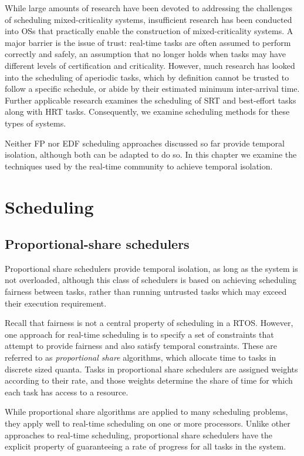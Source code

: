 While large amounts of research have been devoted to addressing the challenges of scheduling
mixed-criticality systems, insufficient research has been conducted into
\glspl{OS} that practically enable the construction of mixed-criticality systems. 
A major barrier is the issue of trust: real-time tasks are often
assumed to perform correctly and safely, an assumption that no longer holds when tasks may have
different levels of certification and criticality.  However, much research has looked into the scheduling of
aperiodic tasks, which by definition cannot be trusted to follow a specific schedule, or abide by
their estimated minimum inter-arrival time. Further applicable research examines the scheduling of
\gls{SRT} and best-effort tasks along with \gls{HRT} tasks. Consequently, we examine scheduling methods for
these types of systems. 

Neither \gls{FP} nor \gls{EDF} scheduling
approaches discussed so far provide temporal isolation, although both can be adapted to do so.  In
this chapter we examine the techniques used by the real-time community to achieve temporal
isolation.

\section{Scheduling}


\subsection{Proportional-share schedulers}
\label{s:pfair}

Proportional share schedulers provide temporal isolation, as long as the system is not overloaded,
although this class of schedulers is based on achieving scheduling fairness between tasks, rather
than running untrusted tasks which may exceed their execution requirement. 

Recall that fairness is not a central property of scheduling in a \acrlong{RTOS}. However, one approach
for real-time scheduling is to specify a set of constraints that attempt to provide fairness and
also satisfy temporal constraints.  These are referred to as \emph{proportional share} algorithms,
which allocate time to tasks in discrete sized quanta. Tasks in proportional share schedulers are assigned 
weights according to their rate, and those weights determine the share of time for which each task 
has access to a resource.

While proportional share algorithms are applied to many scheduling problems, they apply
well to real-time scheduling on one or more processors.
Unlike other approaches to real-time scheduling, proportional share schedulers have the explicit property of guaranteeing a rate of progress for all tasks in the system.

